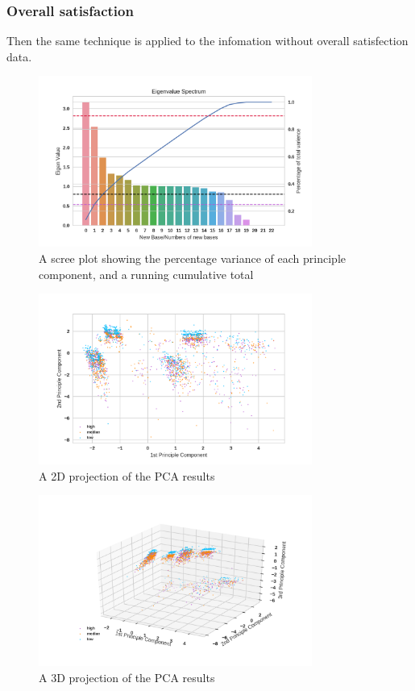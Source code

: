 \documentclass[12pt]{article}
\begin{document}
\subsubsection{Overall satisfaction}
Then the same technique is applied to the infomation without overall satisfection data.
\begin{figure}[htb]
\centering
\includegraphics[width = 0.8\textwidth]{images/eigenvalues2.png}
\caption{ A scree plot showing the percentage variance of each principle component, and a running cumulative total}
\label{fig:eigenvalues1}
\end{figure}
\begin{figure}[htb]
\centering
\includegraphics[width = 0.8\textwidth]{images/pca2-2d.png}
\caption{A 2D projection of the PCA results}
\label{fig:pca2-2d}
\end{figure}
\begin{figure}[htb]
\centering
\includegraphics[width = 0.8\textwidth]{images/pca2-3d.png}
\caption{A 3D projection of the PCA results}
\label{fig:pca2-3d}
\end{figure}
\end{document}
